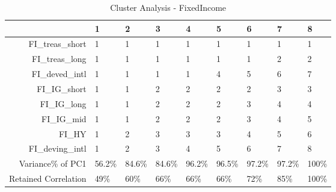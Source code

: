 \begin{longtable}{rllllllll}
\caption{Cluster Analysis - FixedIncome} \\ 
  \hline
 & 1 & 2 & 3 & 4 & 5 & 6 & 7 & 8 \\ 
  \hline
FI\_treas\_short & 1 & 1 & 1 & 1 & 1 & 1 & 1 & 1 \\ 
  FI\_treas\_long & 1 & 1 & 1 & 1 & 1 & 1 & 2 & 2 \\ 
  FI\_deved\_intl & 1 & 1 & 1 & 1 & 4 & 5 & 6 & 7 \\ 
  FI\_IG\_short & 1 & 1 & 2 & 2 & 2 & 2 & 3 & 3 \\ 
  FI\_IG\_long & 1 & 1 & 2 & 2 & 2 & 3 & 4 & 4 \\ 
  FI\_IG\_mid & 1 & 1 & 2 & 2 & 2 & 3 & 4 & 5 \\ 
  FI\_HY & 1 & 2 & 3 & 3 & 3 & 4 & 5 & 6 \\ 
  FI\_deving\_intl & 1 & 2 & 3 & 4 & 5 & 6 & 7 & 8 \\ 
  Variance\% of PC1 & 56.2\% & 84.6\% & 84.6\% & 96.2\% & 96.5\% & 97.2\% & 97.2\% & 100\% \\ 
  Retained Correlation & 49\% & 60\% & 66\% & 66\% & 66\% & 72\% & 85\% & 100\% \\ 
   \hline
\hline
\end{longtable}
